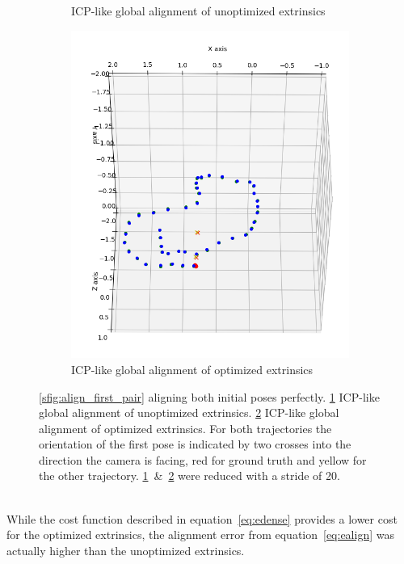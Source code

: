 \begin{figure}[ht]
\begin{subfigure}[b]{.32\textwidth}
                \caption{ICP-like global alignment of unoptimized extrinsics}
                \label{sfig:align_global}
            \end{subfigure}
            \begin{subfigure}[b]{.32\textwidth}
                \includegraphics[width=.95\textwidth]{images/align_global_opt}
                \caption{ICP-like global alignment of optimized extrinsics}
                \label{sfig:align_global_opt}
            \end{subfigure}
            \caption[]{\ref{sfig:align_first_pair} aligning both initial poses perfectly. \ref{sfig:align_global} ICP-like global alignment of unoptimized extrinsics. \ref{sfig:align_global_opt} ICP-like global alignment of optimized extrinsics. For both trajectories the orientation of the first pose is indicated by two crosses into the direction the camera is facing, red for ground truth and yellow for the other trajectory. \ref{sfig:align_global}~\&~\ref{sfig:align_global_opt} were reduced with a stride of 20.}
            \label{fig:vis_perspective}
        \end{figure}\\
        While the cost function described in equation~\ref{eq:edense} provides a lower cost for the optimized extrinsics, the alignment error from equation~\ref{eq:ealign} was actually higher than the unoptimized extrinsics.

